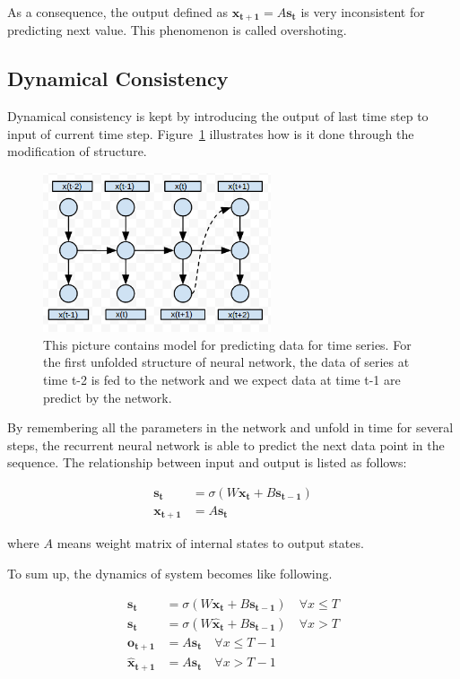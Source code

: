 \documentclass[officiallayout]{tktla}
\begin{document}
As a consequence, the output defined as $\mathbf{x_{t+1}} = A\mathbf{s_{t}}$ is very inconsistent for predicting next value. This phenomenon is called overshoting.
\subsection{Dynamical Consistency}

Dynamical consistency is kept by introducing the output of last time step to input of current time step. Figure~\ref{series_prediction_rnn} illustrates how is it done through the modification of structure.

\begin{figure}[h!]
  \centering
    \includegraphics[width=0.6\textwidth]{series_prediction_rnn}
  \caption{This picture contains model for predicting data for time series. For the first unfolded structure of neural network, the data of series at time t-2 is fed to the network and we expect data at time t-1 are predict by the network.}\label{series_prediction_rnn}
\end{figure}

By remembering all the parameters in the network and unfold in time for several steps, the recurrent neural network is able to predict the next data point in the sequence. The relationship between input and output is listed as follows:

\begin{align}
\mathbf{s_{t}} &= \sigma(W\mathbf{x_t} + B\mathbf{s_{t-1}}) \\
\mathbf{x_{t+1}} &= A\mathbf{s_{t}}
\end{align}

where $A$ means weight matrix of internal states to output states.


To sum up, the dynamics of system becomes like following.

\begin{align}
\mathbf{s_{t}} &= \sigma(W\mathbf{x_t} + B\mathbf{s_{t-1}}) \quad \forall x \leq T \label{training_rnn}\\ 
\mathbf{s_{t}} &= \sigma(W\mathbf{\hat{x}_t} + B\mathbf{s_{t-1}}) \quad \forall x > T \label{prediction_rnn}\\
\mathbf{o_{t+1}} &= A\mathbf{s_{t}} \quad \forall x \leq T - 1 \label{train_output}\\
\mathbf{\hat{x}_{t+1}} &= A\mathbf{s_{t}}  \quad \forall x > T - 1  \label{train_prediction}
\end{align}
\end{document}
